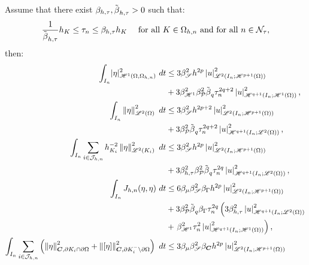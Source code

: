 \newpage
\begin{lemma} \label{lemma:bounds}
    Assume that there exist $\beta_{h, \tau}, \tilde{\beta_{}}_{h, \tau} > 0$ such that:
    \begin{align}
        \frac{1}{\tilde{\beta_{}}_{h, \tau}} h_K &\leq \tau_n \leq \beta_{h, \tau} h_K &\text{ for all } K \in \Omega_{h, n} \text{ and for all } n \in \mathcal{N}_{\tau}, \label{equation:ass_ht}
    \end{align}
    then:
    \begin{align}
        \int_{I_n} \lvert \eta \rvert_{\SpaceHk{1}(\Omega, \Omega_{h, n})}^2 ~ dt &\leq 3 \BoundInterp^2 h^{2p} \Seminorm{u}_{\SpaceLp{2}(I_n; \SpaceHk{p + 1}(\Omega))}^2 \label{eq:bound_1} \\
        &+ 3 \BoundH^2 \BoundPoly^2 \BoundQVariant \tau_n^{2q + 2} \Seminorm{u}_{\SpaceHk{q + 1}(I_n; \SpaceHk{1}(\Omega))}^2, \notag \\
        \TimeIntN{\Norm{\eta}_{\SpaceLp{2}(\Omega)}^2} & \leq 3 \BoundInterp^2 h^{2p + 2} \Seminorm{u}_{\SpaceLp{2}(I_n; \SpaceHk{p + 1}(\Omega))}^2 \label{eq:bound_2} \\
        &+ 3 \BoundPoly^2 \BoundQVariant \tau_n^{2q + 2} \Seminorm{u}_{\SpaceHk{q + 1}(I_n; \SpaceLp{2}(\Omega))}^2, \notag \\
        \TimeIntN{ \sum_{i \in \SpaceTimeIndices} h_{K_i}^{-2} \Norm{\eta}_{\SpaceLp{2}(K_i)}^2 } &\leq 3 \BoundInterp^2 h^{2p} \Seminorm{u}_{\SpaceLp{2}(I_n; \SpaceHk{p + 1}(\Omega))}^2 \label{eq:bound_3} \\
        &+  3 \BoundHT^2 \BoundPoly^2 \BoundQVariant \tau_n^{2q} \Seminorm{u}_{\SpaceHk{q + 1}(I_n; \SpaceLp{2}(\Omega))}^2, \notag \\
        \TimeIntN{J_{h, n}(\eta, \eta)} &\leq 6 \BoundTrace \BoundInterp^2 \BoundDeg h^{2p} \Seminorm{u}_{\SpaceLp{2}(I_n; \SpaceHk{p + 1}(\Omega))}^2 \label{eq:bound_4} \\
        &+ 3 \BoundPoly^2 \BoundQVariant \BoundDeg \tau_n^{2q} \left( 3 \BoundHT^2 \Seminorm{u}_{\SpaceHk{q + 1}(I_n; \SpaceLp{2}(\Omega))}^2 \right. \notag \\
        &+ \left.\BoundH^2 \tau_n^2 \Seminorm{u}_{\SpaceHk{q + 1}(I_n; \SpaceHk{1}(\Omega))}^2 \right), \notag \\
        \TimeIntN{ \sum_{i \in \SpaceTimeIndices} \left( \Norm{\eta}_{\Convection, \partial K_i \cap \partial \Omega}^2 + \Norm{\left[ \eta \right]}_{\Convection, \partial K_i^- \setminus \partial \Omega}^2 \right) } &\leq 3 \BoundTrace \BoundInterp^2 \BoundC{\Convection} h^{2p} \Seminorm{u}_{\SpaceLp{2}(I_n; \SpaceHk{p + 1}(\Omega))}^2 \label{eq:bound_5} \\

\end{align}
\end{lemma}
